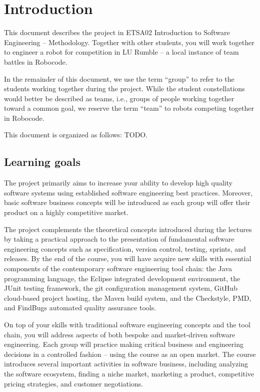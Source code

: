\documentclass{scrreprt}
\begin{document}
\chapter{Introduction}
This document describes the project in ETSA02 Introduction to Software Engineering -- Methodology. Together with other students, you will work together to engineer a robot for competition in LU Rumble -- a local instance of team battles in Robocode. 

In the remainder of this document, we use the term ``group'' to refer to the students working together during the project. While the student constellations would better be described as teams, i.e., groups of people working together toward a common goal, we reserve the term ``team'' to robots competing together in Robocode.

This document is organized as follows: TODO.

\section{Learning goals}
The project primarily aims to increase your ability to develop high quality software systems using established software engineering best practices. Moreover, basic software business concepts will be introduced  as each group will offer their product on a highly competitive market.

The project complements the theoretical concepts introduced during the lectures by taking a practical approach to the presentation of fundamental software engineering concepts such as specification, version control, testing, sprints, and releases. By the end of the course, you will have acquire new skills with essential components of the contemporary  software engineering tool chain: the Java programming language, the Eclipse integrated development environment, the JUnit testing framework, the git configuration management system, GitHub cloud-based project hosting, the Maven build system, and the Checkstyle, PMD, and FindBugs automated quality assurance tools.

On top of your skills with traditional software engineering concepts and the tool chain, you will address aspects of both bespoke and market-driven software engineering. Each group will practice making critical business and engineering decisions in a controlled fashion -- using the course as an open market. The course introduces several important activities in software business, including analyzing the software ecosystem, finding a niche market, marketing a product, competitive pricing strategies, and customer negotiations.
\end{document}
